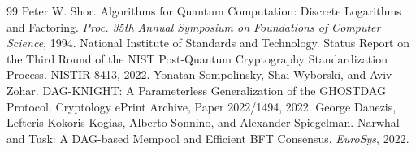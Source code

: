 \documentclass[11pt,a4paper]{article}
\begin{document}
\begin{thebibliography}{99}
 Peter W. Shor. Algorithms for Quantum Computation: Discrete Logarithms and Factoring. \emph{Proc. 35th Annual Symposium on Foundations of Computer Science}, 1994.
 National Institute of Standards and Technology. Status Report on the Third Round of the NIST Post-Quantum Cryptography Standardization Process. NISTIR 8413, 2022.
 Yonatan Sompolinsky, Shai Wyborski, and Aviv Zohar. DAG-KNIGHT: A Parameterless Generalization of the GHOSTDAG Protocol. Cryptology ePrint Archive, Paper 2022/1494, 2022.
 George Danezis, Lefteris Kokoris-Kogias, Alberto Sonnino, and Alexander Spiegelman. Narwhal and Tusk: A DAG-based Mempool and Efficient BFT Consensus. \emph{EuroSys}, 2022.
\end{thebibliography}
\end{document}
